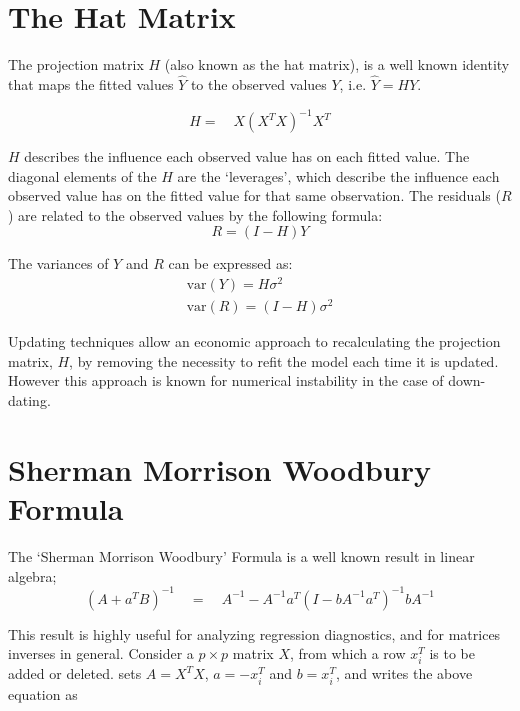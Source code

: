 \documentclass[12pt, a4paper]{report}
\theoremstyle{plain}
\theoremstyle{definition}
\theoremstyle{remark}
\begin{document}
\section{The Hat Matrix} %

The projection matrix $H$ (also known as the hat matrix), is a
well known identity that maps the fitted values $\hat{Y}$ to the
observed values $Y$, i.e. $\hat{Y} = HY$.

\begin{equation}
H =\quad X(X^{T}X)^{-1}X^{T}
\end{equation}

$H$ describes the influence each observed value has on each fitted
value. The diagonal elements of the $H$ are the `leverages', which
describe the influence each observed value has on the fitted value
for that same observation. The residuals ($R$) are related to the
observed values by the following formula:
\begin{equation}
R = (I-H)Y
\end{equation}

The variances of $Y$ and $R$ can be expressed as:
\begin{eqnarray}
\mbox{var}(Y) = H\sigma^{2} \nonumber\\
\mbox{var}(R) = (I-H)\sigma^{2}
\end{eqnarray}

Updating techniques allow an economic approach to recalculating
the projection matrix, $H$, by removing the necessity to refit the
model each time it is updated. However this approach is known for
numerical instability in the case of down-dating.

\section{Sherman Morrison Woodbury Formula} %

The `Sherman Morrison Woodbury' Formula is a well known result in
linear algebra;
\begin{equation}
(A+a^{T}B)^{-1} \quad = \quad A^{-1}-
A^{-1}a^{T}(I-bA^{-1}a^{T})^{-1}bA^{-1}
\end{equation}

This result is highly useful for analyzing regression diagnostics,
and for matrices inverses in general. Consider a $p \times p$
matrix $X$, from which a row $x_{i}^{T}$ is to be added or
deleted. \citet{CookWeisberg} sets $A = X^{T}X$, $a=-x_{i}^{T}$
and $b=x_{i}^{T}$, and writes the above equation as
\end{document}
